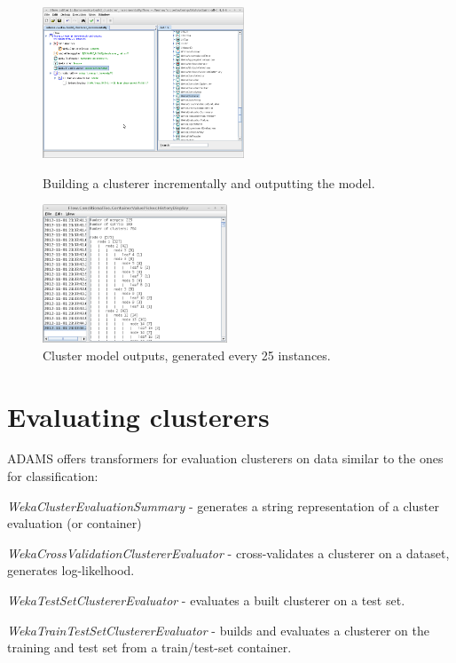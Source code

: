 \begin{figure}[ht]
  \begin{minipage}[t]{0.5\linewidth}
    \centering
    \includegraphics[width=6.0cm]{images/build_clusterer_incrementally-flow.png}
    \caption{Building a clusterer incrementally and outputting the model.}
    \label{build_clusterer_incrementally-flow}
  \end{minipage}
  \hspace{0.5cm}
  \begin{minipage}[t]{0.5\linewidth}
    \centering
    \includegraphics[width=5.5cm]{images/build_clusterer_incrementally-output.png}
    \caption{Cluster model outputs, generated every 25 instances.}
    \label{build_clusterer_incrementally-output}
  \end{minipage}
\end{figure}

\section{Evaluating clusterers}
ADAMS offers transformers for evaluation clusterers on data similar to the 
ones for classification:
\begin{tight_itemize}
	\item \textit{WekaClusterEvaluationSummary} - generates a string representation
	of a cluster evaluation (or container)
	\item \textit{WekaCrossValidationClustererEvaluator} - cross-validates a
	clusterer on a dataset, generates log-likelhood.
	\item \textit{WekaTestSetClustererEvaluator} - evaluates a built clusterer
	on a test set.
	\item \textit{WekaTrainTestSetClustererEvaluator} - builds and evaluates
	a clusterer on the training and test set from a train/test-set container.
\end{tight_itemize}

